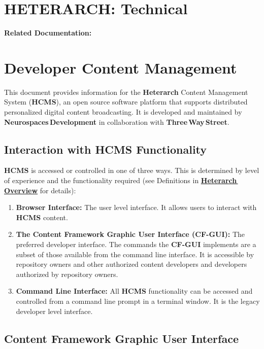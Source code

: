 \documentclass[12pt]{article}
\begin{document}
\section*{HETERARCH: Technical}

{\bf Related Documentation:}

\section*{Developer Content Management}

This document provides information for the {\bf \small Heterarch} Content Management System ({\bf \small HCMS}), an open source software platform that supports distributed personalized digital content broadcasting. It is developed and maintained by {\bf Neurospaces\,Development} in collaboration with {\bf Three\,Way\,Street}.

\subsection*{Interaction with HCMS Functionality}

{\bf \small HCMS} is accessed or controlled in one of three ways. This is determined by level of experience and the functionality required (see Definitions in \href{../heterarch-overview/heterarch-overview.tex}{\bf Heterarch\,Overview} for details):

\begin{enumerate}
\item{\bf Browser Interface:} The user level interface. It allows users to interact with {\bf \small HCMS} content.
\item {\bf The Content Framework Graphic User Interface (CF-GUI):} The preferred developer interface. The commands the {\bf \small CF-GUI} implements are a subset of those available from the command line interface. It is accessible by repository owners and other authorized content developers and developers authorized by repository owners.
\item {\bf Command Line Interface:} All {\bf \small HCMS} functionality can be accessed and controlled from a command line prompt in a terminal window. It is the legacy developer level interface.
\end{enumerate}

\subsection*{Content Framework Graphic User Interface}
\end{document}
